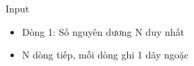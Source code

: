 Input  
\begin{itemize}
	\item     Dòng 1: Số nguyên dương N duy nhất   
	\item     N dòng tiếp, mỗi dòng ghi 1 dãy ngoặc   
\end{itemize}
